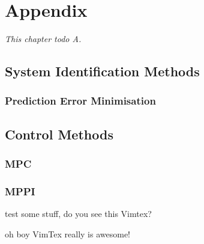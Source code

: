 \chapter{Appendix}%
\label{chap:appendix}
\textit{This chapter todo A.\bs}

\section{System Identification Methods}
\subsection{Prediction Error Minimisation}

\section{Control Methods}
\subsection{\acs{MPC}}
\subsection{\acs{MPPI}}

test some stuff, do you see this Vimtex?

oh boy VimTex really is awesome!

